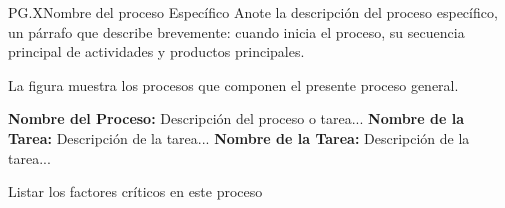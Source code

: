 \begin{Proceso}{PG.X}{Nombre del proceso Específico}{
		Anote la descripción del proceso específico, un párrafo que describe brevemente: cuando inicia el proceso, su secuencia principal de actividades y productos principales.
	}
{	}
\end{Proceso}

	La figura  muestra los procesos que componen el presente proceso general.



\begin{PDescripcion}
	\Ppaso[\PSubProceso] \textbf{Nombre del Proceso:} Descripción del proceso o tarea...
	\Ppaso[\itarea] \textbf{Nombre de la Tarea:} Descripción de la tarea...
	\Ppaso[\Einicio] \textbf{Nombre de la Tarea:} Descripción de la tarea...
\end{PDescripcion}


\begin{FCDescripcion}
	\FCpaso Listar los factores críticos en este proceso
\end{FCDescripcion}








